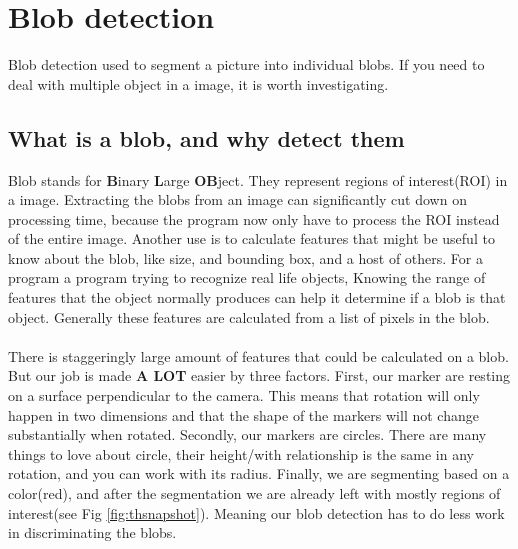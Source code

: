 \section{Blob detection}
Blob detection used to segment a picture into individual blobs. If you need to deal with multiple object in a image, it is worth investigating. 
\subsection{What is a blob, and why detect them}
Blob stands for \textbf{B}inary \textbf{L}arge \textbf{OB}ject. They represent regions of interest(ROI) in a image. Extracting the blobs from an image can significantly cut down on processing time, because the program now only have to process the ROI instead of the entire image. Another use is to calculate features that might be useful to know about the blob, like size, and bounding box, and a host of others. For a program a program trying to recognize real life objects, Knowing the range of features that the object normally produces can help it determine if a blob is that object. Generally these features are calculated from a list of pixels in the blob.\\\\
There is staggeringly large amount of features that could be calculated on a blob. But our job is made \textbf{A LOT} easier by three factors. First, our marker are resting on a surface perpendicular to the camera. This means that rotation will only happen in two dimensions and that the shape of the markers will not change substantially when rotated. Secondly, our markers are circles. There are many things to love about circle, their height/with relationship is the same in any rotation, and you can work with its radius. Finally, we are segmenting based on a color(red), and after the segmentation we are already left with mostly regions of interest(see Fig \ref{fig:thsnapshot}). Meaning our blob detection has to do less work in discriminating the blobs.
